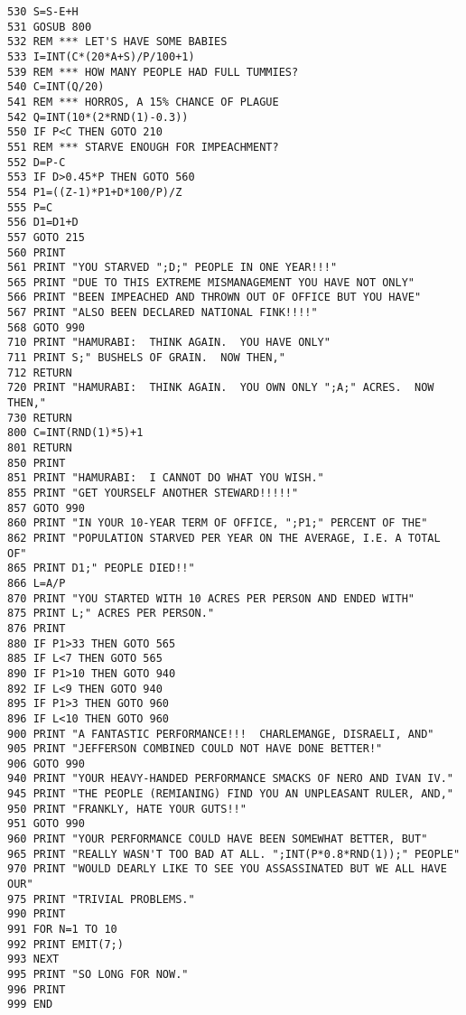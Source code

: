 \begin{lstlisting}
530 S=S-E+H
531 GOSUB 800
532 REM *** LET'S HAVE SOME BABIES
533 I=INT(C*(20*A+S)/P/100+1)
539 REM *** HOW MANY PEOPLE HAD FULL TUMMIES?
540 C=INT(Q/20)
541 REM *** HORROS, A 15% CHANCE OF PLAGUE
542 Q=INT(10*(2*RND(1)-0.3))
550 IF P<C THEN GOTO 210
551 REM *** STARVE ENOUGH FOR IMPEACHMENT?
552 D=P-C
553 IF D>0.45*P THEN GOTO 560
554 P1=((Z-1)*P1+D*100/P)/Z
555 P=C
556 D1=D1+D
557 GOTO 215
560 PRINT
561 PRINT "YOU STARVED ";D;" PEOPLE IN ONE YEAR!!!"
565 PRINT "DUE TO THIS EXTREME MISMANAGEMENT YOU HAVE NOT ONLY"
566 PRINT "BEEN IMPEACHED AND THROWN OUT OF OFFICE BUT YOU HAVE"
567 PRINT "ALSO BEEN DECLARED NATIONAL FINK!!!!"
568 GOTO 990
710 PRINT "HAMURABI:  THINK AGAIN.  YOU HAVE ONLY"
711 PRINT S;" BUSHELS OF GRAIN.  NOW THEN,"
712 RETURN
720 PRINT "HAMURABI:  THINK AGAIN.  YOU OWN ONLY ";A;" ACRES.  NOW THEN,"
730 RETURN
800 C=INT(RND(1)*5)+1
801 RETURN
850 PRINT
851 PRINT "HAMURABI:  I CANNOT DO WHAT YOU WISH."
855 PRINT "GET YOURSELF ANOTHER STEWARD!!!!!"
857 GOTO 990
860 PRINT "IN YOUR 10-YEAR TERM OF OFFICE, ";P1;" PERCENT OF THE"
862 PRINT "POPULATION STARVED PER YEAR ON THE AVERAGE, I.E. A TOTAL OF"
865 PRINT D1;" PEOPLE DIED!!"
866 L=A/P
870 PRINT "YOU STARTED WITH 10 ACRES PER PERSON AND ENDED WITH"
875 PRINT L;" ACRES PER PERSON."
876 PRINT
880 IF P1>33 THEN GOTO 565
885 IF L<7 THEN GOTO 565
890 IF P1>10 THEN GOTO 940
892 IF L<9 THEN GOTO 940
895 IF P1>3 THEN GOTO 960
896 IF L<10 THEN GOTO 960
900 PRINT "A FANTASTIC PERFORMANCE!!!  CHARLEMANGE, DISRAELI, AND"
905 PRINT "JEFFERSON COMBINED COULD NOT HAVE DONE BETTER!"
906 GOTO 990
940 PRINT "YOUR HEAVY-HANDED PERFORMANCE SMACKS OF NERO AND IVAN IV."
945 PRINT "THE PEOPLE (REMIANING) FIND YOU AN UNPLEASANT RULER, AND,"
950 PRINT "FRANKLY, HATE YOUR GUTS!!"
951 GOTO 990
960 PRINT "YOUR PERFORMANCE COULD HAVE BEEN SOMEWHAT BETTER, BUT"
965 PRINT "REALLY WASN'T TOO BAD AT ALL. ";INT(P*0.8*RND(1));" PEOPLE"
970 PRINT "WOULD DEARLY LIKE TO SEE YOU ASSASSINATED BUT WE ALL HAVE OUR"
975 PRINT "TRIVIAL PROBLEMS."
990 PRINT
991 FOR N=1 TO 10
992 PRINT EMIT(7;)
993 NEXT
995 PRINT "SO LONG FOR NOW."
996 PRINT
999 END
\end{lstlisting}
